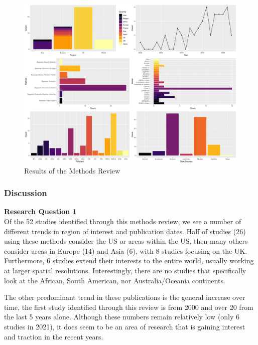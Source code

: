 \begin{figure}
    \centering
    \includegraphics[width=\linewidth]{Images/Methods Review.pdf}
\caption{Results of the Methods Review}
\label{fig:methodsreview}
\end{figure}

\subsubsection{Discussion}
\textbf{Research Question 1} \\
Of the 52 studies identified through this methods review, we see a number of different trends in region of interest and publication dates. Half of studies (26) using these methods consider the US or areas within the US, then many others consider areas in Europe (14) and Asia (6), with 8 studies focusing on the UK. Furthermore, 6 studies extend their interests to the entire world, usually working at larger spatial resolutions. Interestingly, there are no studies that specifically look at the African, South American, nor Australia/Oceania continents. 

The other predominant trend in these publications is the general increase over time, the first study identified through this review is from 2000 and over 20 from the last 5 years alone. Although these numbers remain relatively low (only 6 studies in 2021), it does seem to be an area of research that is gaining interest and traction in the recent years.

